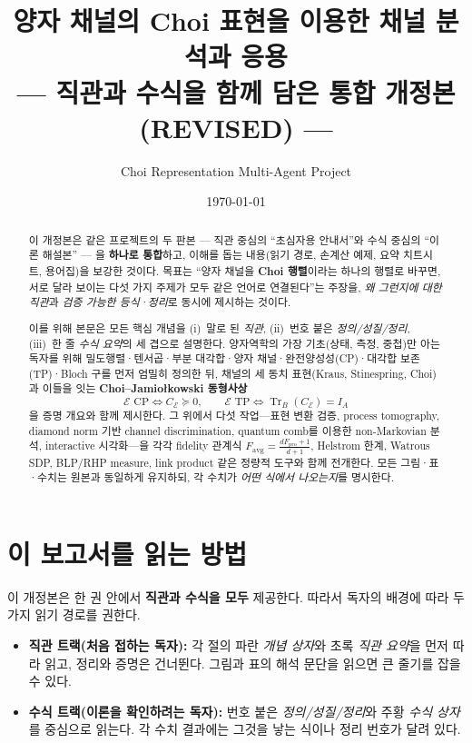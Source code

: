 \documentclass[11pt,a4paper]{article}
\title{\textbf{양자 채널의 Choi 표현을 이용한 채널 분석과 응용\\[5pt]
\large{--- 직관과 수식을 함께 담은 통합 개정본 (REVISED) ---}}}
\author{Choi Representation Multi-Agent Project}
\date{\today}
\newcommand{\E}{\mathcal{E}}
\newcommand{\Tr}{\operatorname{Tr}}
\theoremstyle{definition}
\theoremstyle{plain}
\theoremstyle{remark}
\begin{document}
\maketitle

\begin{abstract}
이 개정본은 같은 프로젝트의 두 판본 --- 직관 중심의 ``초심자용 안내서''와 수식 중심의 ``이론 해설본'' --- 을 \textbf{하나로 통합}하고, 이해를 돕는 내용(읽기 경로, 손계산 예제, 요약 치트시트, 용어집)을 보강한 것이다. 목표는 ``양자 채널을 \textbf{Choi 행렬}이라는 하나의 행렬로 바꾸면, 서로 달라 보이는 다섯 가지 주제가 모두 같은 언어로 연결된다''는 주장을, \emph{왜 그런지에 대한 직관}과 \emph{검증 가능한 등식·정리}로 동시에 제시하는 것이다.

이를 위해 본문은 모든 핵심 개념을 (i)~말로 된 \emph{직관}, (ii)~번호 붙은 \emph{정의/성질/정리}, (iii)~한 줄 \emph{수식 요약}의 세 겹으로 설명한다. 양자역학의 가장 기초(상태, 측정, 중첩)만 아는 독자를 위해 밀도행렬·텐서곱·부분 대각합·양자 채널·완전양성성(CP)·대각합 보존(TP)·Bloch 구를 먼저 엄밀히 정의한 뒤, 채널의 세 동치 표현(Kraus, Stinespring, Choi)과 이들을 잇는 \textbf{Choi--Jamio{\l}kowski 동형사상}
\[
\E\text{ CP}\iff C_\E\succeq0,\qquad \E\text{ TP}\iff \Tr_B(C_\E)=I_A
\]
을 증명 개요와 함께 제시한다. 그 위에서 다섯 작업---표현 변환 검증, process tomography, diamond norm 기반 channel discrimination, quantum comb를 이용한 non-Markovian 분석, interactive 시각화---을 각각 fidelity 관계식 $F_{\mathrm{avg}}=\frac{dF_{\mathrm{pro}}+1}{d+1}$, Helstrom 한계, Watrous SDP, BLP/RHP measure, link product 같은 정량적 도구와 함께 전개한다. 모든 그림·표·수치는 원본과 동일하게 유지하되, 각 수치가 \emph{어떤 식에서 나오는지}를 명시한다.
\end{abstract}

\tableofcontents
\newpage

\section{이 보고서를 읽는 방법}

이 개정본은 한 권 안에서 \textbf{직관과 수식을 모두} 제공한다. 따라서 독자의 배경에 따라 두 가지 읽기 경로를 권한다.

\begin{itemize}
  \item \textbf{직관 트랙(처음 접하는 독자):} 각 절의 파란 \emph{개념 상자}와 초록 \emph{직관 요약}을 먼저 따라 읽고, 정리와 증명은 건너뛴다. 그림과 표의 해석 문단을 읽으면 큰 줄기를 잡을 수 있다.
  \item \textbf{수식 트랙(이론을 확인하려는 독자):} 번호 붙은 \emph{정의/성질/정리}와 주황 \emph{수식 상자}를 중심으로 읽는다. 각 수치 결과에는 그것을 낳는 식이나 정리 번호가 달려 있다.
\end{itemize}
\end{document}
